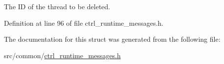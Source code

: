 The I\-D of the thread to be deleted. 



Definition at line 96 of file ctrl\-\_\-runtime\-\_\-messages.\-h.



The documentation for this struct was generated from the following file\-:\begin{DoxyCompactItemize}
\item 
src/common/\hyperlink{ctrl__runtime__messages_8h}{ctrl\-\_\-runtime\-\_\-messages.\-h}\end{DoxyCompactItemize}
